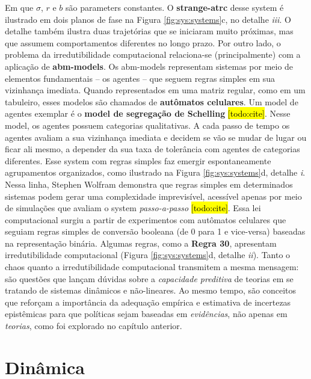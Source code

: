 \documentclass[./main.tex]{subfiles}
\begin{document}
Em que $\sigma$, $r$ e $b$ são \gls{parameters} constantes. O \textbf{\gls{strange-atrc}} desse \gls{system} é ilustrado em dois planos de fase na Figura \ref{fig:sys:systems}c, no detalhe \textrm{\textit{iii}}. O detalhe também ilustra duas trajetórias que se iniciaram muito próximas, mas que assumem comportamentos diferentes no longo prazo. Por outro lado, o problema da irredutibilidade computacional relaciona-se (principalmente) com a aplicação de \textbf{\gls{abm-models}}. Os \gls{abm-models} representam sistemas por meio de elementos fundamentais – os agentes – que seguem regras simples em sua vizinhança imediata. Quando representados em uma matriz regular, como em um tabuleiro, esses modelos são chamados de \textbf{autômatos celulares}. Um \gls{model} de agentes exemplar é o \textbf{\gls{model} de segregação de Schelling} \hl{[todo:cite]}. Nesse \gls{model}, os agentes possuem categorias qualitativas. A cada passo de tempo os agentes avaliam a sua vizinhança imediata e decidem se vão se mudar de lugar ou ficar ali mesmo, a depender da sua taxa de tolerância com agentes de categorias diferentes. Esse \gls{system} com regras simples faz emergir espontaneamente agrupamentos organizados, como ilustrado na Figura \ref{fig:sys:systems}d, detalhe \textrm{\textit{i}}. Nessa linha, Stephen Wolfram demonstra que regras simples em determinados sistemas podem gerar uma complexidade imprevisível, acessível apenas por meio de simulações que avaliam o \gls{system} \textit{passo-a-passo} \hl{[todo:cite]}. Essa lei computacional surgiu a partir de experimentos com autômatos celulares que seguiam regras simples de conversão booleana (de 0 para 1 e vice-versa) baseadas na representação binária. Algumas regras, como a \textbf{Regra 30}, apresentam irredutibilidade computacional (Figura \ref{fig:sys:systems}d, detalhe \textrm{\textit{ii}}). Tanto o \gls{chaos} quanto a irredutibilidade computacional transmitem a mesma mensagem: são questões que lançam dúvidas sobre a \textit{capacidade preditiva} de teorias em se tratando de sistemas dinâmicos e não-lineares. Ao mesmo tempo, são conceitos que reforçam a importância da adequação empírica e estimativa de incertezas epistêmicas para que políticas sejam baseadas em \textit{evidências}, não apenas em \textit{teorias}, como foi explorado no capítulo anterior.

\section{Dinâmica} \label{sec:sys:dynamics}
\end{document}
